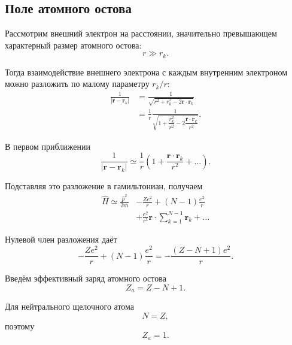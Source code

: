 \documentclass[../final.tex]{subfiles}
\begin{document}
\subsection{Поле атомного остова}

Рассмотрим внешний электрон на расстоянии, значительно превышающем
характерный размер атомного остова:
\begin{equation*}
    r\gg r_k.
\end{equation*}

Тогда взаимодействие внешнего электрона с каждым внутренним электроном
можно разложить по малому параметру \(r_k/r\):
\begin{align*}
    \frac{1}{|\mathbf r-\mathbf r_k|}
    &=
    \frac{1}
    {\sqrt{r^2+r_k^2-2\mathbf r\cdot\mathbf r_k}}
    \\
    &=
    \frac{1}{r}
    \frac{1}
    {\sqrt{
        1+\dfrac{r_k^2}{r^2}
        -2\dfrac{\mathbf r\cdot\mathbf r_k}{r^2}
    }}.
\end{align*}

В первом приближении
\begin{equation*}
    \frac{1}{|\mathbf r-\mathbf r_k|}
    \simeq
    \frac{1}{r}
    \left(
        1+
        \frac{\mathbf r\cdot\mathbf r_k}{r^2}
        +\ldots
    \right).
\end{equation*}

Подставляя это разложение в гамильтониан, получаем
\begin{align*}
    \hat H
    \simeq
    \frac{\hat p^2}{2m}
    &-
    \frac{Ze^2}{r}
    +
    (N-1)\frac{e^2}{r}
    \\
    &+
    \frac{e^2}{r^3}
    \mathbf r\cdot
    \sum_{k=1}^{N-1}\mathbf r_k
    +\ldots
\end{align*}

Нулевой член разложения даёт
\begin{equation*}
    -\frac{Ze^2}{r}
    +(N-1)\frac{e^2}{r}
    =
    -\frac{(Z-N+1)e^2}{r}.
\end{equation*}

Введём эффективный заряд атомного остова
\begin{equation*}
    \boxed{
        Z_a=Z-N+1
    }.
\end{equation*}

Для нейтрального щелочного атома
\begin{equation*}
    N=Z,
\end{equation*}
поэтому
\begin{equation*}
    \boxed{
        Z_a=1
    }.
\end{equation*}
\end{document}

